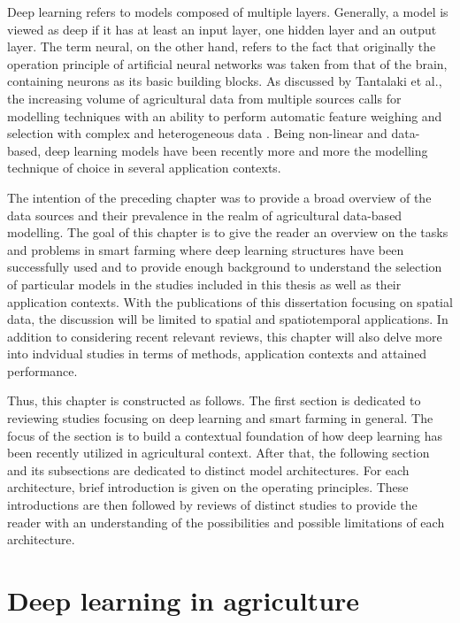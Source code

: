 Deep learning refers to models composed of multiple layers. Generally, a model is viewed as deep if it has at least an input layer, one hidden layer and an output layer. The term neural, on the other hand, refers to the fact that originally the operation principle of artificial neural networks was taken from that of the brain, containing neurons as its basic building blocks. As discussed by Tantalaki et al., the increasing volume of agricultural data from multiple sources calls for modelling techniques with an ability to perform automatic feature weighing and selection with complex and heterogeneous data \cite{Tantalaki2019}. Being non-linear and data-based, deep learning models have been recently more and more the modelling technique of choice in several application contexts.

The intention of the preceding chapter was to provide a broad overview of the data sources and their prevalence in the realm of agricultural data-based modelling. The goal of this chapter is to give the reader an overview on the tasks and problems in smart farming where deep learning structures have been successfully used and to provide enough background to understand the selection of particular models in the studies included in this thesis as well as their application contexts. With the publications of this dissertation focusing on spatial data, the discussion will be limited to spatial and spatiotemporal applications. In addition to considering recent relevant reviews, this chapter will also delve more into indvidual studies in terms of methods, application contexts and attained performance. 

Thus, this chapter is constructed as follows. The first section is dedicated to reviewing studies focusing on deep learning and smart farming in general. The focus of the section is to build a contextual foundation of how deep learning has been recently utilized in agricultural context. After that, the following section and its subsections are dedicated to distinct model architectures. For each architecture, brief introduction is given on the operating principles. These introductions are then followed by reviews of distinct studies to provide the reader with an understanding of the possibilities and possible limitations of each architecture.

\section{Deep learning in agriculture}
\label{sec:dl-in-agri-review}

